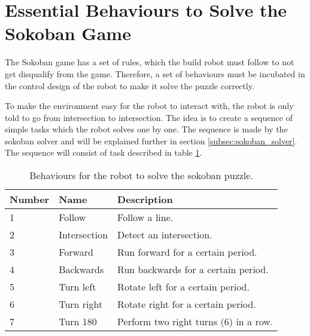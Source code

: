 \documentclass[../report.tex]{subfiles}
\begin{document}
\section{Essential Behaviours to Solve the Sokoban Game} \label{sec:behaviours}

The Sokoban game has a set of rules, which the build robot must follow to not get disqualify from the game. Therefore, a set of behaviours must be incubated in the control design of the robot to make it solve the puzzle correctly.

To make the environment easy for the robot to interact with, the robot is only told to go from intersection to intersection. The idea is to create a sequence of simple tasks which the robot solves one by one. The sequence is made by the sokoban solver and will be explained further in section \ref{subsec:sokoban_solver}. The sequence will consist of task described in table \ref{tab:behaviours}.

\begin{table}[H]
\centering
\begin{tabular}{lll}
\toprule
\textbf{Number} & \textbf{Name} & \textbf{Description} \\ \midrule
1 & Follow & Follow a line. \\
2 & Intersection & Detect an intersection. \\
3 & Forward & Run forward for a certain period. \\
4 & Backwards & Run backwards for a certain period. \\
5 & Turn left & Rotate left for a certain period. \\
6 & Turn right & Rotate right for a certain period. \\
7 & Turn 180 & Perform two right turns (6) in a row. \\ \bottomrule
\end{tabular}
\caption{Behaviours for the robot to solve the sokoban puzzle.}
\label{tab:behaviours}
\end{table}
\end{document}
